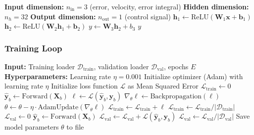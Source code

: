 \begin{algorithm}[htbp]
\caption{Motor Controller Network Architecture}
\label{alg:network_architecture}
\begin{algorithmic}[1]
\State \textbf{Input dimension:} $n_{\text{in}} = 3$ (error, velocity, error integral)
\State \textbf{Hidden dimension:} $n_h = 32$
\State \textbf{Output dimension:} $n_{\text{out}} = 1$ (control signal)
\State
{}
    \State $\mathbf{h}_1 \gets \text{ReLU}(\mathbf{W}_1 \mathbf{x} + \mathbf{b}_1)$ 
    \State $\mathbf{h}_2 \gets \text{ReLU}(\mathbf{W}_2 \mathbf{h}_1 + \mathbf{b}_2)$ 
    \State $y \gets \mathbf{W}_3 \mathbf{h}_2 + b_3$ 
    \State \Return $y$
\EndFunction
\end{algorithmic}
\end{algorithm}

\subsubsection{Training Loop}

\begin{algorithm}[htbp]
\caption{Neural Network Training Loop}
\label{alg:training_loop}
\begin{algorithmic}[1]
\State \textbf{Input:} Training loader $\mathcal{D}_{\text{train}}$, validation loader $\mathcal{D}_{\text{val}}$, epochs $E$
\State \textbf{Hyperparameters:} Learning rate $\eta = 0.001$
\State Initialize optimizer (Adam) with learning rate $\eta$
\State Initialize loss function $\mathcal{L}$ as Mean Squared Error
\State
{}
    \State {}
    \State $\mathcal{L}_{\text{train}} \gets 0$
        \State $\hat{\mathbf{y}}_b \gets \text{Forward}(\mathbf{X}_b)$
        \State $\ell \gets \mathcal{L}(\hat{\mathbf{y}}_b, \mathbf{y}_b)$
        \State $\nabla_\theta \ell \gets \text{Backpropagation}(\ell)$
        \State $\theta \gets \theta - \eta \cdot \text{AdamUpdate}(\nabla_\theta \ell)$
        \State $\mathcal{L}_{\text{train}} \gets \mathcal{L}_{\text{train}} + \ell$
    \EndFor
    \State $\mathcal{L}_{\text{train}} \gets \mathcal{L}_{\text{train}} / |\mathcal{D}_{\text{train}}|$
    \State
    \State {}
    \State $\mathcal{L}_{\text{val}} \gets 0$
        \State $\hat{\mathbf{y}}_b \gets \text{Forward}(\mathbf{X}_b)$
        \State $\mathcal{L}_{\text{val}} \gets \mathcal{L}_{\text{val}} + \mathcal{L}(\hat{\mathbf{y}}_b, \mathbf{y}_b)$
    \EndFor
    \State $\mathcal{L}_{\text{val}} \gets \mathcal{L}_{\text{val}} / |\mathcal{D}_{\text{val}}|$
\EndFor
\State Save model parameters $\theta$ to file
\end{algorithmic}
\end{algorithm}


